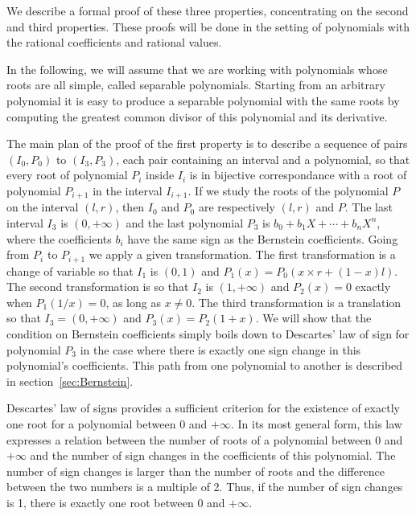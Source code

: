 \documentclass{mscs}
\begin{document}
We describe a formal proof of these three properties,
concentrating on the second and third properties. These proofs will be
done in the setting of polynomials with the rational coefficients and
rational values.

In the following, we will assume that we are working with polynomials
whose roots are all simple, called separable polynomials.
Starting from an arbitrary polynomial it is easy to produce a
separable polynomial with the same roots by computing the greatest
common divisor of this polynomial and its derivative.


The main plan of the proof of the first property is to describe a
sequence of pairs \((I_0, P_0)\) to \((I_3, P_3)\), each pair
containing an interval and a polynomial, so that every root of
polynomial \(P_i\) inside \(I_i\) is in bijective correspondance with
a root of polynomial \(P_{i+1}\) in the interval \(I_{i+1}\).  If we
study the roots of the polynomial $P$ on the interval $(l, r)$,
then $I_0$ and $P_0$ are respectively $(l, r)$ and $P$.
The last interval $I_3$ is \((0, +\infty)\) and the last polynomial
$P_3$ is \(b_0 + b_1 X + \cdots + b_n X^n\), where the coefficients
\(b_i\) have the
same sign as the Bernstein coefficients.  Going from \(P_i\) to
\(P_{i+1}\) we apply a given transformation.  The first transformation
is a change of variable so that \(I_1\) is \((0,1)\) and \(P_1(x) =
P_0(x \times r + (1 - x) l)\).  The second transformation is so that
\(I_2\) is \((1,+\infty)\) and \(P_2(x) = 0\) exactly when \(P_1(1/x)
= 0\), as long as \(x\neq 0\).  The third transformation is a
translation so that \(I_3 = (0,+\infty)\) and \(P_3(x) = P_2(1+x)\).
We will show that the condition on Bernstein coefficients simply
boils down to Descartes' law of sign \cite{descartes, bpr} for
polynomial \(P_3\) in the
case where there is exactly one sign change in this polynomial's coefficients.
This path from one polynomial to another is described in section~\ref{sec:Bernstein}.

Descartes' law of signs provides a sufficient criterion for the
existence of exactly one root for a polynomial
between 0 and \(+\infty\).  In its
most general form, this law
expresses a relation between the number of roots of a polynomial
between 0 and \(+\infty\) and the number of sign changes in the
coefficients of this polynomial.  The number of sign changes is larger
than the number of roots and the difference between the two numbers is
a multiple of 2.  Thus, if the number of sign changes is 1, there is
exactly one root between 0 and \(+\infty\).
\end{document}
